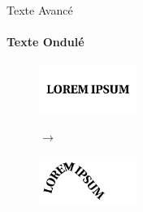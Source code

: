 \documentclass[10pt,svgnames,usenames,table]{beamer}
\begin{document}
\begin{frame}{Texte Avancé}
		\framesubtitle{Texte Ondulé}
		\begin{figure}[H]
			\centering
			\begin{minipage}{.5\textwidth}
				\centering
				\includegraphics[height=60px]{Images/text/lorem} 
				\end{minipage}$\rightarrow$%
			\begin{minipage}{.5\textwidth}
				\centering
				\includegraphics[height=60px]{Images/text/courbf} 
				\end{minipage}
			\end{figure}	
\end{frame}
\end{document}
